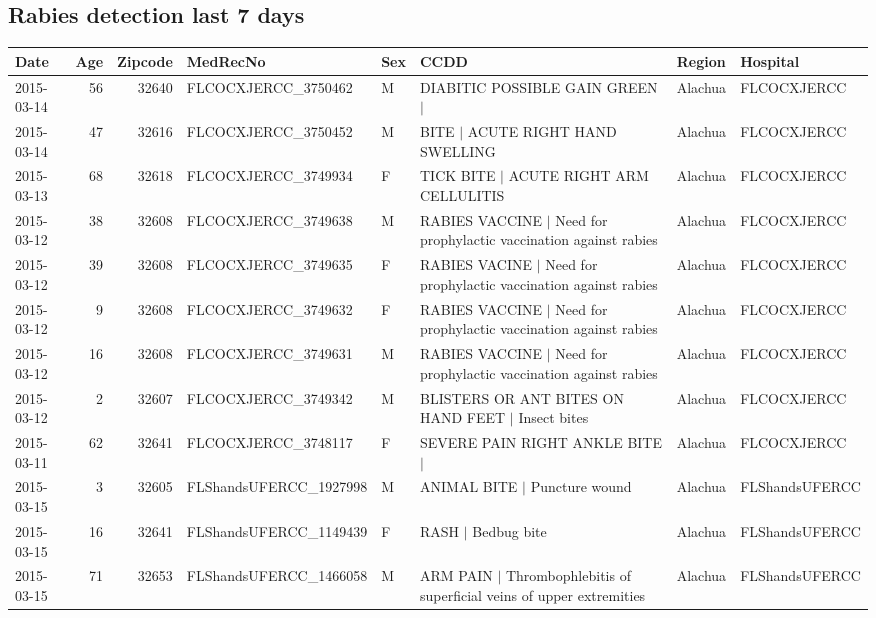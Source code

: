 \documentclass[12pt]{article}
\begin{document}
\subsection*{Rabies detection last 7 days}

\begin{table}[H]
\begin{table}[ht]
\centering
{\tiny
\begin{tabular}{lrrlllll}
  \hline
Date & Age & Zipcode & MedRecNo & Sex & CCDD & Region & Hospital \\ 
  \hline
2015-03-14 &  56 & 32640 & FLCOCXJERCC\_3750462 & M & DIABITIC POSSIBLE GAIN GREEN $|$ & Alachua & FLCOCXJERCC \\ 
  2015-03-14 &  47 & 32616 & FLCOCXJERCC\_3750452 & M & BITE $|$ ACUTE RIGHT HAND SWELLING & Alachua & FLCOCXJERCC \\ 
  2015-03-13 &  68 & 32618 & FLCOCXJERCC\_3749934 & F & TICK BITE $|$ ACUTE RIGHT ARM CELLULITIS & Alachua & FLCOCXJERCC \\ 
  2015-03-12 &  38 & 32608 & FLCOCXJERCC\_3749638 & M & RABIES VACCINE $|$ Need for prophylactic vaccination against rabies & Alachua & FLCOCXJERCC \\ 
  2015-03-12 &  39 & 32608 & FLCOCXJERCC\_3749635 & F & RABIES VACINE $|$ Need for prophylactic vaccination against rabies & Alachua & FLCOCXJERCC \\ 
  2015-03-12 &   9 & 32608 & FLCOCXJERCC\_3749632 & F & RABIES VACCINE $|$ Need for prophylactic vaccination against rabies & Alachua & FLCOCXJERCC \\ 
  2015-03-12 &  16 & 32608 & FLCOCXJERCC\_3749631 & M & RABIES VACCINE $|$ Need for prophylactic vaccination against rabies & Alachua & FLCOCXJERCC \\ 
  2015-03-12 &   2 & 32607 & FLCOCXJERCC\_3749342 & M & BLISTERS OR ANT BITES ON HAND FEET $|$ Insect bites & Alachua & FLCOCXJERCC \\ 
  2015-03-11 &  62 & 32641 & FLCOCXJERCC\_3748117 & F & SEVERE PAIN RIGHT ANKLE BITE $|$ & Alachua & FLCOCXJERCC \\ 
  2015-03-15 &   3 & 32605 & FLShandsUFERCC\_1927998 & M & ANIMAL BITE $|$ Puncture wound & Alachua & FLShandsUFERCC \\ 
  2015-03-15 &  16 & 32641 & FLShandsUFERCC\_1149439 & F & RASH $|$ Bedbug bite & Alachua & FLShandsUFERCC \\ 
  2015-03-15 &  71 & 32653 & FLShandsUFERCC\_1466058 & M & ARM PAIN $|$ Thrombophlebitis of superficial veins of upper extremities & Alachua & FLShandsUFERCC \\ 

\end{tabular}}
\end{table}
\end{table}
\end{document}
